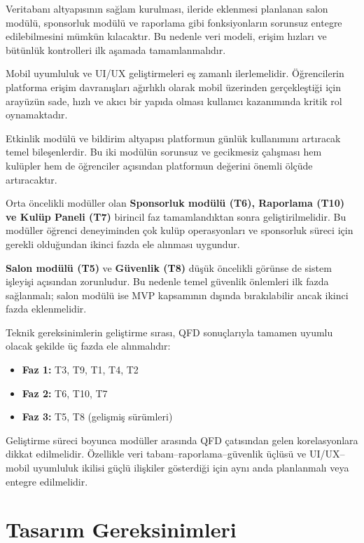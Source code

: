 \documentclass[a4paper,12pt]{report}
\begin{document}
Veritabanı altyapısının sağlam kurulması, ileride eklenmesi planlanan salon modülü, sponsorluk modülü ve raporlama gibi fonksiyonların sorunsuz entegre edilebilmesini mümkün kılacaktır. Bu nedenle veri modeli, erişim hızları ve bütünlük kontrolleri ilk aşamada tamamlanmalıdır.

Mobil uyumluluk ve UI/UX geliştirmeleri eş zamanlı ilerlemelidir. Öğrencilerin platforma erişim davranışları ağırlıklı olarak mobil üzerinden gerçekleştiği için arayüzün sade, hızlı ve akıcı bir yapıda olması kullanıcı kazanımında kritik rol oynamaktadır.

Etkinlik modülü ve bildirim altyapısı platformun günlük kullanımını artıracak temel bileşenlerdir. Bu iki modülün sorunsuz ve gecikmesiz çalışması hem kulüpler hem de öğrenciler açısından platformun değerini önemli ölçüde artıracaktır.

Orta öncelikli modüller olan \textbf{Sponsorluk modülü (T6), Raporlama (T10) ve Kulüp Paneli (T7)} birincil faz tamamlandıktan sonra geliştirilmelidir. Bu modüller öğrenci deneyiminden çok kulüp operasyonları ve sponsorluk süreci için gerekli olduğundan ikinci fazda ele alınması uygundur.

\textbf{Salon modülü (T5)} ve \textbf{Güvenlik (T8)} düşük öncelikli görünse de sistem işleyişi açısından zorunludur. Bu nedenle temel güvenlik önlemleri ilk fazda sağlanmalı; salon modülü ise MVP kapsamının dışında bırakılabilir ancak ikinci fazda eklenmelidir.

Teknik gereksinimlerin geliştirme sırası, QFD sonuçlarıyla tamamen uyumlu olacak şekilde üç fazda ele alınmalıdır:

\begin{itemize}
    \item \textbf{Faz 1:} T3, T9, T1, T4, T2
    \item \textbf{Faz 2:} T6, T10, T7
    \item \textbf{Faz 3:} T5, T8 (gelişmiş sürümleri)
\end{itemize}

Geliştirme süreci boyunca modüller arasında QFD çatısından gelen korelasyonlara dikkat edilmelidir. Özellikle veri tabanı–raporlama–güvenlik üçlüsü ve UI/UX–mobil uyumluluk ikilisi güçlü ilişkiler gösterdiği için aynı anda planlanmalı veya entegre edilmelidir.

\section{Tasarım Gereksinimleri}
\end{document}
